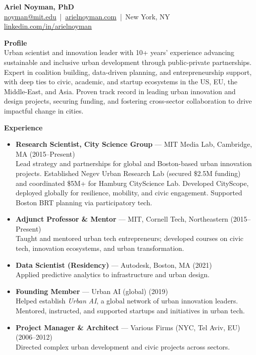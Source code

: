 \documentclass[a4paper,10pt]{article}
\begin{document}
\begin{center}
    {\LARGE \textbf{Ariel Noyman, PhD}} \\
    \href{mailto:noyman@mit.edu}{noyman@mit.edu} \,|\, \href{http://arielnoyman.com}{arielnoyman.com} \,|\, New York, NY \\
    \href{https://www.linkedin.com/in/arielnoyman}{linkedin.com/in/arielnoyman}
\end{center}


\vspace{2em}

\noindent \textbf{Profile} \\
Urban scientist and innovation leader with 10+ years’ experience advancing sustainable and inclusive urban development through public-private partnerships. Expert in coalition building, data-driven planning, and entrepreneurship support, with deep ties to civic, academic, and startup ecosystems in the US, EU, the Middle-East, and Asia. Proven track record in leading urban innovation and design projects, securing funding, and fostering cross-sector collaboration to drive impactful change in cities.



\vspace{2em}

\noindent \textbf{Experience}

\begin{itemize}[leftmargin=1.2em]
    \item \textbf{Research Scientist, City Science Group} — MIT Media Lab, Cambridge, MA (2015–Present) \\
          Lead strategy and partnerships for global and Boston-based urban innovation projects. Established Negev Urban Research Lab (secured \$2.5M funding) and coordinated \$5M+ for Hamburg CityScience Lab. Developed CityScope, deployed globally for resilience, mobility, and civic engagement. Supported Boston BRT planning via participatory tech.

    \item \textbf{Adjunct Professor \& Mentor} — MIT, Cornell Tech, Northeastern (2015–Present) \\
          Taught and mentored urban tech entrepreneurs; developed courses on civic tech, innovation ecosystems, and urban transformation.

    \item \textbf{Data Scientist (Residency)} — Autodesk, Boston, MA (2021) \\
          Applied predictive analytics to infrastructure and urban design.

    \item \textbf{Founding Member} — Urban AI (global) (2019) \\
          Helped establish \textit{Urban AI}, a global network of urban innovation leaders. Mentored, instructed, and supported startups and initiatives in urban tech.

    \item \textbf{Project Manager \& Architect} — Various Firms (NYC, Tel Aviv, EU) (2006–2012) \\
          Directed complex urban development and civic projects across sectors.
\end{itemize}
\end{document}
